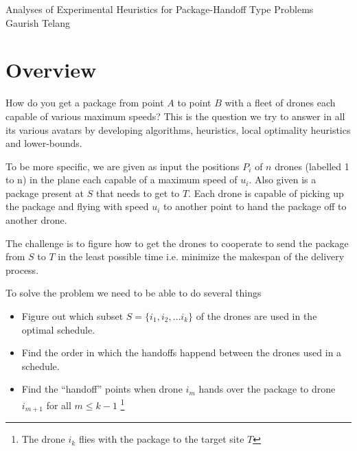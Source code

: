 \documentclass[12.0pt]{report}
\begin{document}
\begin{titlepage}
	\centering
        {\Huge Analyses of Experimental Heuristics for Package-Handoff Type Problems\\}
        \vspace{20mm}
        {\Large Gaurish Telang}
\end{titlepage}
\setcounter{page}{2} 
\setcounter{tocdepth}{1}
\tableofcontents
{}

\chapter{Overview}

How do you get a package from point $A$ to point $B$ with a fleet of drones each 
capable of various maximum speeds? This is the question we try to answer in all 
its various avatars by developing algorithms, heuristics, local optimality heuristics 
and lower-bounds. 

To be more specific,  we are given as input the positions $P_i$ of $n$ drones (labelled 1 to n) 
in the plane each capable of a maximum speed of $u_i$. Also given is a package present 
at $S$ that needs to get to $T$. Each drone is capable of picking up the package and 
flying with speed $u_i$ to another point to hand the package off to another drone. 


The challenge is to figure how to get the drones to cooperate to send 
the package from $S$ to $T$ in the least possible time i.e. minimize the makespan
of the delivery process. 

To solve the problem we need to be able to do several things

\begin{itemize}
\item Figure out which subset $S = \{i_1, i_2, \ldots i_k\}$ of the drones are used in the optimal schedule. 
\item Find the order in which the handoffs happend between the drones used in a schedule. 
\item Find the ``handoff'' points when drone $i_m$ hands over the package to drone $i_{m+1}$ for all $m \leq k-1$ 
      \footnote{The drone $i_k$ flies with the package to the target site $T$}
\end{itemize}
\end{document}
